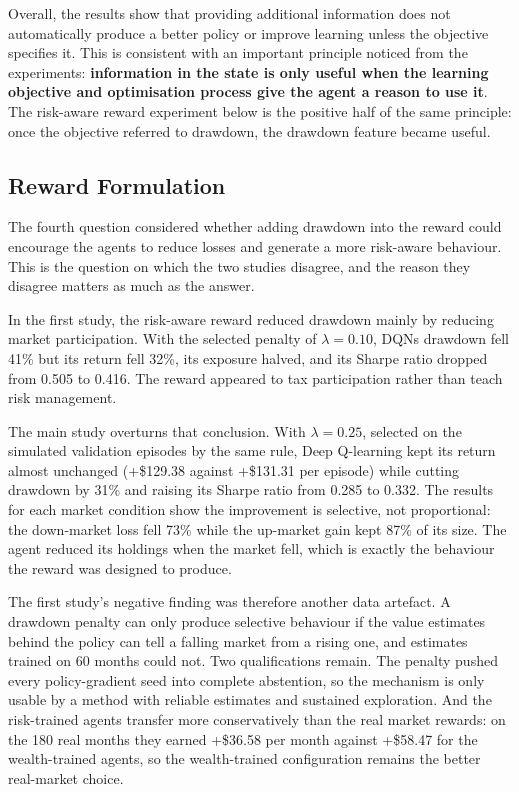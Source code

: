 Overall, the results show that providing additional information does
not automatically produce a better policy or improve learning unless the
objective specifies it. This is consistent with an important principle
noticed from the experiments: \textbf{information in the state is only
useful when the learning objective and optimisation process give the
agent a reason to use it}. The risk-aware reward experiment below is the
positive half of the same principle: once the objective referred to
drawdown, the drawdown feature became useful.

\subsection{Reward Formulation}

The fourth question considered whether adding drawdown into the reward
could encourage the agents to reduce losses and generate a more
risk-aware behaviour. This is the question on which the two studies
disagree, and the reason they disagree matters as much as the answer.

In the first study, the risk-aware reward reduced drawdown mainly by reducing
market participation. With the selected penalty of \(\lambda = 0.10\),
DQN\textquotesingle s drawdown fell 41\% but its return fell 32\%, its
exposure halved, and its Sharpe ratio dropped from 0.505 to 0.416. The
reward appeared to tax participation rather than teach risk management.

The main study overturns that conclusion. With \(\lambda = 0.25\),
selected on the simulated validation episodes by the same rule, Deep
Q-learning kept its return almost unchanged (+\$129.38 against +\$131.31
per episode) while cutting drawdown by 31\% and raising its Sharpe ratio
from 0.285 to 0.332. The results for each market condition show the improvement is
selective, not proportional: the down-market loss fell 73\% while the
up-market gain kept 87\% of its size. The agent reduced its holdings
when the market fell, which is exactly the behaviour the reward was
designed to produce.

The first study's negative finding was therefore another data artefact. A
drawdown penalty can only produce selective behaviour if the value
estimates behind the policy can tell a falling market from a rising one,
and estimates trained on 60 months could not. Two qualifications remain.
The penalty pushed every policy-gradient seed into complete abstention,
so the mechanism is only usable by a method with reliable estimates and
sustained exploration. And the risk-trained agents transfer more
conservatively than the real market rewards: on the 180 real months they
earned +\$36.58 per month against +\$58.47 for the wealth-trained
agents, so the wealth-trained configuration remains the better
real-market choice.

